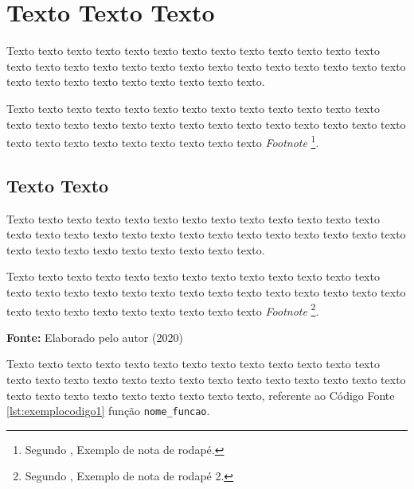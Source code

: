 \chapter{Texto Texto Texto}

Texto texto texto texto texto texto texto texto texto texto texto texto texto texto texto texto texto texto texto texto texto texto texto texto texto texto texto texto texto texto texto texto texto texto texto texto.

Texto texto texto texto texto texto texto texto texto texto texto texto texto texto texto texto texto texto texto texto texto texto texto texto texto texto texto texto texto texto texto texto texto texto texto texto \textit{Footnote} \footnote{Segundo , Exemplo de nota de rodapé.}.

\section{Texto Texto}

Texto texto texto texto texto texto texto texto texto texto texto texto texto texto texto texto texto texto texto texto texto texto texto texto texto texto texto texto texto texto texto texto texto texto texto texto.

Texto texto texto texto texto texto texto texto texto texto texto texto texto texto texto texto texto texto texto texto texto texto texto texto texto texto texto texto texto texto texto texto texto texto texto texto \textit{Footnote} \footnote{Segundo , Exemplo de nota de rodapé 2.}.



\hspace{4cm}
\hfill
\begin{minipage}[t]{.65\textwidth}
\ABNTEXfontereduzida\selectfont\textbf{Fonte:} Elaborado pelo autor (2020) 
\end{minipage}


Texto texto texto texto texto texto texto texto texto texto texto texto texto texto texto texto texto texto texto texto texto texto texto texto texto texto texto texto texto texto texto texto texto texto texto texto, referente ao Código Fonte \ref{lst:exemplocodigo1} função \texttt{nome\_funcao}.

